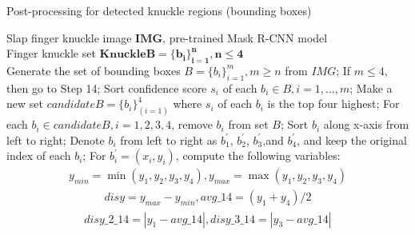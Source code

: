 \begin{algorithm}[h!]
    \renewcommand{\algorithmicrequire}{\textbf{Input:}}
    \renewcommand{\algorithmicensure}{\textbf{Output:}}
    \caption{Post-processing for detected knuckle regions (bounding boxes)}
    \begin{algorithmic}[1]
        \REQUIRE Slap finger knuckle image $\bm{IMG}$, pre-trained Mask R-CNN model \\ 
        \ENSURE Finger knuckle set $\bm{KnuckleB = \{b_i\}_{i=1}^n, n\leq 4}$\\
        \STATE Generate the set of bounding boxes $B= \{b_i\}_{i=1}^m,m\geq n$ from $IMG$;
        \STATE If $m \leq 4$, then go to Step 14;
        \STATE Sort confidence score $s_i$ of each $b_i \in B, i = 1, ..., m$;
        \STATE Make a new set $candidateB= \{b_i\}_(i=1)^4$ where $s_i$ of each $b_i$ is the top four highest;
        \STATE For each $b_i \in candidateB, i=1,2,3,4$, remove $b_i$ from set $B$;
        \STATE Sort $b_i$ along x-axis from left to right;
        \STATE Denote $b_i$ from left to right as $b_1^{'}$, $b_2^{'}$, $b_3^{'}$,and $b_4^{'}$, and keep the original index of each $b_i$;
        \STATE For $b_i^{'}=(x_i,y_i)$, compute the following variables:\\
        \footnotesize{
            \begin{equation}
                \begin{aligned}
                    y_{min}=\min (y_1, y_2, y_3, y_4), y_{max}= \max (y_1, y_2, y_3, y_4)
                \end{aligned}
                \label{equation-1}
            \end{equation}
            \begin{equation}
                \begin{aligned}
                    disy = y_{max} - y_{min}, avg\_14=(y_1+y_4)/2
                \end{aligned}
                \label{equation-2}
            \end{equation}
            \begin{equation}
                \begin{aligned}
                    disy\_2\_14 = \left|y_1-avg\_14\right|, disy\_3\_14=\left|y_3-avg\_14\right|
                \end{aligned}
                \label{equation-3}
            \end{equation}
            \begin{equation}
                \begin{aligned}

\end{aligned}
\end{equation}}
\end{algorithmic}
\end{algorithm}
